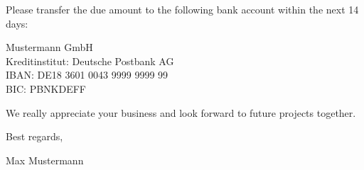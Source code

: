 \documentclass[10pt, a4paper]{article}
\begin{document}
\vspace{15mm}

\sffamily
\small
Please transfer the due amount to the following bank account within the
next 14 days:

Mustermann GmbH\\
Kreditinstitut: Deutsche Postbank AG\\
IBAN: DE18 3601 0043 9999 9999 99\\
BIC: PBNKDEFF

We really appreciate your business and look forward to future projects
together.

Best regards,

\medskip

Max Mustermann
\end{document}
